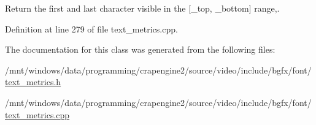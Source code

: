 Return the first and last character visible in the \mbox{[}\+\_\+top, \+\_\+bottom\mbox{]} range,. 



Definition at line 279 of file text\+\_\+metrics.\+cpp.



The documentation for this class was generated from the following files\+:\begin{DoxyCompactItemize}
\item 
/mnt/windows/data/programming/crapengine2/source/video/include/bgfx/font/\hyperlink{text__metrics_8h}{text\+\_\+metrics.\+h}\item 
/mnt/windows/data/programming/crapengine2/source/video/include/bgfx/font/\hyperlink{text__metrics_8cpp}{text\+\_\+metrics.\+cpp}\end{DoxyCompactItemize}
